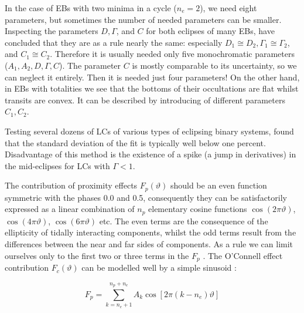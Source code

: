 In the case of EBs with two minima in a cycle ($n_{e} = 2$), we
need eight parameters, but sometimes the number of needed parameters
can be smaller. 
Inspecting the parameters $D, \Gamma$, and $C$ for both eclipses of many EBs, \cite{mikulasek2015} have concluded that they
are as a rule nearly the same: especially $D_{1} \cong D_{2}, \Gamma_{1} \cong \Gamma_{2}$, and $C_{1} \cong C_{2}$. 
Therefore it is usually needed only five monochromatic parameters ($A_{1}, A_{2}, D, \Gamma,C$). 
The parameter $C$ is mostly comparable to its uncertainty, so we can neglect it entirely. Then it is needed just four parameters! 
On the other hand, in EBs with totalities we see that the bottoms of their occultations are flat whilst transits
are convex. It can be described by introducing of different parameters $C_{1},C_{2}$.

%

Testing several dozens of LCs of various types of eclipsing binary systems, \citeauthor{mikulasek2015} found
that the standard deviation of the fit is typically well below one percent. 
Disadvantage of this method is the existence of a spike (a jump in derivatives) in the mid-eclipses for LCs with $\Gamma < 1$.

The contribution of proximity effects $F_{p}(\vartheta)$ should be an
even function symmetric with the phases 0.0 and 0.5, consequently
they can be satisfactorily expressed as a linear combination of $n_{p}$ elementary cosine functions $\cos(2\pi \vartheta)$,
$\cos(4\pi \vartheta)$, $\cos(6\pi \vartheta)$ etc. The even terms are the consequence
of the ellipticity of tidally interacting components, whilst the odd
terms result from the differences between the near and far sides
of components. As a rule we can limit ourselves only to the first
two or three terms in the $F_{p}$ \citep{russell1952,kallrath2009eclipsing}. 
The O'Connell effect contribution $F_{c}(\vartheta)$ can be modelled well by a simple sinusoid \citep{davidge1984, wilsey2009}:

\begin{equation}\label{eq:mik_Fp}
F_{p}  = \sum_{k=n_{e}+1}^{n_{p}+n_{e}} A_{k}\cos \left[ 2\pi(k-n_{e})\vartheta\right]
\end{equation}

